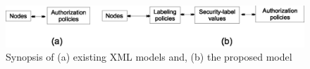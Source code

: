  
 	\begin{figure} [t]
 		\centering
 		\includegraphics[width=.9\textwidth]{NSS16/indirection}
 		\caption{Synopsis of (a) existing XML models  and, (b) the proposed model}
 		\label{fig:indirection}
 	\end{figure}
 